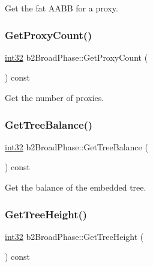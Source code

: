 Get the fat A\+A\+BB for a proxy. 

\mbox{\label{classb2_broad_phase_ab7a8c31223d8404b79f6c57e8fc69837}} 
\subsubsection{\texorpdfstring{GetProxyCount()}{GetProxyCount()}}
{\footnotesize\ttfamily \mbox{\hyperlink{b2_settings_8h_a43d43196463bde49cb067f5c20ab8481}{int32}} b2\+Broad\+Phase\+::\+Get\+Proxy\+Count (\begin{DoxyParamCaption}{ }\end{DoxyParamCaption}) const\hspace{0.3cm}{\ttfamily [inline]}}



Get the number of proxies. 

\mbox{\label{classb2_broad_phase_a29612faf9f0191827440178629d5e887}} 
\subsubsection{\texorpdfstring{GetTreeBalance()}{GetTreeBalance()}}
{\footnotesize\ttfamily \mbox{\hyperlink{b2_settings_8h_a43d43196463bde49cb067f5c20ab8481}{int32}} b2\+Broad\+Phase\+::\+Get\+Tree\+Balance (\begin{DoxyParamCaption}{ }\end{DoxyParamCaption}) const\hspace{0.3cm}{\ttfamily [inline]}}



Get the balance of the embedded tree. 

\mbox{\label{classb2_broad_phase_a868f95225d62c3ea79d231ed305253ea}} 
\subsubsection{\texorpdfstring{GetTreeHeight()}{GetTreeHeight()}}
{\footnotesize\ttfamily \mbox{\hyperlink{b2_settings_8h_a43d43196463bde49cb067f5c20ab8481}{int32}} b2\+Broad\+Phase\+::\+Get\+Tree\+Height (\begin{DoxyParamCaption}{ }\end{DoxyParamCaption}) const\hspace{0.3cm}{\ttfamily [inline]}}



